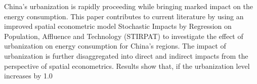China's urbanization is rapidly proceeding while bringing marked impact on the energy consumption. This paper contributes to current literature by using an improved spatial econometric model Stochastic Impacts by Regression on Population, Affluence and Technology (STIRPAT) to investigate the effect of urbanization on energy consumption for China's regions. The impact of urbanization is further disaggregated into direct and indirect impacts from the perspective of spatial econometrics. Results show that, if the urbanization level increases by 1.0%